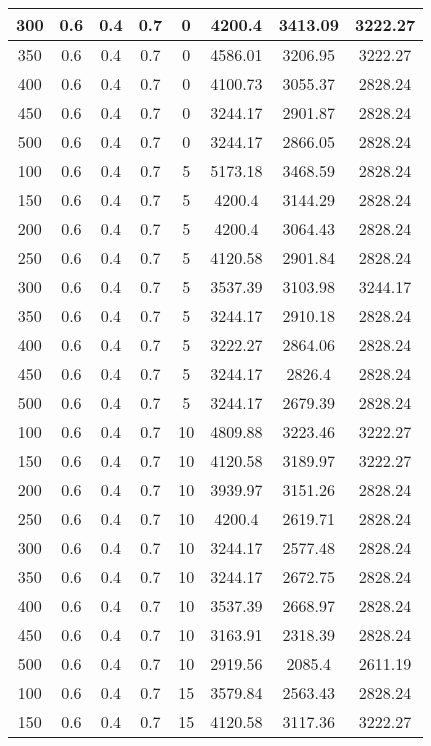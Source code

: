 \documentclass[a4paper, 12pt]{extreport}
\begin{document}
\begin{itemize}
\begin{longtable}{|c|c|c|c|c|c|c|c|}
			300 & 0.6 & 0.4 & 0.7 & 0 & 4200.4 & 3413.09 & 3222.27 \\\hline
			350 & 0.6 & 0.4 & 0.7 & 0 & 4586.01 & 3206.95 & 3222.27 \\\hline
			400 & 0.6 & 0.4 & 0.7 & 0 & 4100.73 & 3055.37 & 2828.24 \\\hline
			450 & 0.6 & 0.4 & 0.7 & 0 & 3244.17 & 2901.87 & 2828.24 \\\hline
			500 & 0.6 & 0.4 & 0.7 & 0 & 3244.17 & 2866.05 & 2828.24 \\\hline
			100 & 0.6 & 0.4 & 0.7 & 5 & 5173.18 & 3468.59 & 2828.24 \\\hline
			150 & 0.6 & 0.4 & 0.7 & 5 & 4200.4 & 3144.29 & 2828.24 \\\hline
			200 & 0.6 & 0.4 & 0.7 & 5 & 4200.4 & 3064.43 & 2828.24 \\\hline
			250 & 0.6 & 0.4 & 0.7 & 5 & 4120.58 & 2901.84 & 2828.24 \\\hline
			300 & 0.6 & 0.4 & 0.7 & 5 & 3537.39 & 3103.98 & 3244.17 \\\hline
			350 & 0.6 & 0.4 & 0.7 & 5 & 3244.17 & 2910.18 & 2828.24 \\\hline
			400 & 0.6 & 0.4 & 0.7 & 5 & 3222.27 & 2864.06 & 2828.24 \\\hline
			450 & 0.6 & 0.4 & 0.7 & 5 & 3244.17 & 2826.4 & 2828.24 \\\hline
			500 & 0.6 & 0.4 & 0.7 & 5 & 3244.17 & 2679.39 & 2828.24 \\\hline
			100 & 0.6 & 0.4 & 0.7 & 10 & 4809.88 & 3223.46 & 3222.27 \\\hline
			150 & 0.6 & 0.4 & 0.7 & 10 & 4120.58 & 3189.97 & 3222.27 \\\hline
			200 & 0.6 & 0.4 & 0.7 & 10 & 3939.97 & 3151.26 & 2828.24 \\\hline
			250 & 0.6 & 0.4 & 0.7 & 10 & 4200.4 & 2619.71 & 2828.24 \\\hline
			300 & 0.6 & 0.4 & 0.7 & 10 & 3244.17 & 2577.48 & 2828.24 \\\hline
			350 & 0.6 & 0.4 & 0.7 & 10 & 3244.17 & 2672.75 & 2828.24 \\\hline
			400 & 0.6 & 0.4 & 0.7 & 10 & 3537.39 & 2668.97 & 2828.24 \\\hline
			450 & 0.6 & 0.4 & 0.7 & 10 & 3163.91 & 2318.39 & 2828.24 \\\hline
			500 & 0.6 & 0.4 & 0.7 & 10 & 2919.56 & 2085.4 & 2611.19 \\\hline
			100 & 0.6 & 0.4 & 0.7 & 15 & 3579.84 & 2563.43 & 2828.24 \\\hline
			150 & 0.6 & 0.4 & 0.7 & 15 & 4120.58 & 3117.36 & 3222.27 \\\hline

\end{longtable}
\end{itemize}
\end{document}
